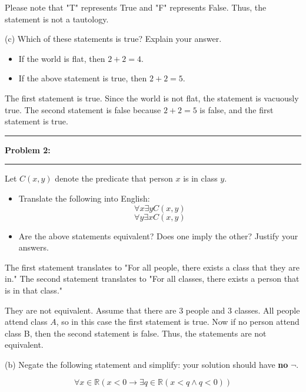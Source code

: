 \documentclass[11pt]{article}
\newcommand\question[2]{\vspace{.25in}\hrule\textbf{#1: #2}\vspace{.5em}\hrule\vspace{.10in}}
\begin{document}
Please note that "T" represents True and "F" represents False.
Thus, the statement is not a tautology.

(c) Which of these statements is true? Explain your answer.
\begin{itemize}
    \item If the world is flat, then $2+2=4$.
    \item If the above statement is true, then $2+2=5$.
\end{itemize}

\solution
The first statement is true. Since the world is not flat, the statement is vacuously true. The second statement is false because $2+2=5$ is false, and the first statement is true.

\question{Problem 2}{}
Let $C(x,y)$ denote the predicate that person $x$ is in class $y$.
\begin{itemize}
    \item Translate the following into English:\[\forall x\exists yC(x, y)\]\[\forall y\exists xC(x, y)\]
    \item Are the above statements equivalent? Does one imply the other? Justify your answers.
\end{itemize}
\solution

The first statement translates to "For all people, there exists a class that they are in." The second statement translates to "For all classes, there exists a person that is in that class."

They are not equivalent. Assume that there are $3$ people and $3$ classes. All people attend class $A$, so in this case the first statement is true.
Now if no person attend class B, then the second statement is false. Thus, the statements are not equivalent.

(b) Negate the following statement and simplify: your solution should have \textbf{no} $\lnot$.

\[\forall x\in \mathbb{R}(x < 0 \to \exists q\in \mathbb{R}(x < q \land q < 0))\]
\end{document}
